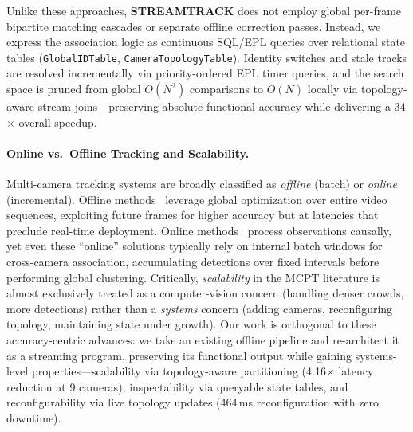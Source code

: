 \documentclass[review]{elsarticle}
\begin{document}
Unlike these approaches, \textbf{STREAMTRACK} does not employ global per-frame bipartite matching cascades or separate offline correction passes. Instead, we express the association logic as continuous SQL/EPL queries over relational state tables (\texttt{GlobalIDTable}, \texttt{CameraTopologyTable}). Identity switches and stale tracks are resolved incrementally via priority-ordered EPL timer queries, and the search space is pruned from global $O(N^2)$ comparisons to $O(N)$ locally via topology-aware stream joins---preserving absolute functional accuracy while delivering a 34$\times$ overall speedup.

\paragraph{Online vs.\ Offline Tracking and Scalability.}
Multi-camera tracking systems are broadly classified as \emph{offline} (batch) or \emph{online} (incremental). Offline methods~\cite{yoshida2024overlap} leverage global optimization over entire video sequences, exploiting future frames for higher accuracy but at latencies that preclude real-time deployment. Online methods~\cite{kim2024cluster,xie2024robust,specker2024ocmctrack} process observations causally, yet even these ``online'' solutions typically rely on internal batch windows for cross-camera association, accumulating detections over fixed intervals before performing global clustering. Critically, \emph{scalability} in the MCPT literature is almost exclusively treated as a computer-vision concern (handling denser crowds, more detections) rather than a \emph{systems} concern (adding cameras, reconfiguring topology, maintaining state under growth). Our work is orthogonal to these accuracy-centric advances: we take an existing offline pipeline and re-architect it as a streaming program, preserving its functional output while gaining systems-level properties---scalability via topology-aware partitioning (4.16$\times$ latency reduction at 9 cameras), inspectability via queryable state tables, and reconfigurability via live topology updates (464\,ms reconfiguration with zero downtime).
\end{document}
